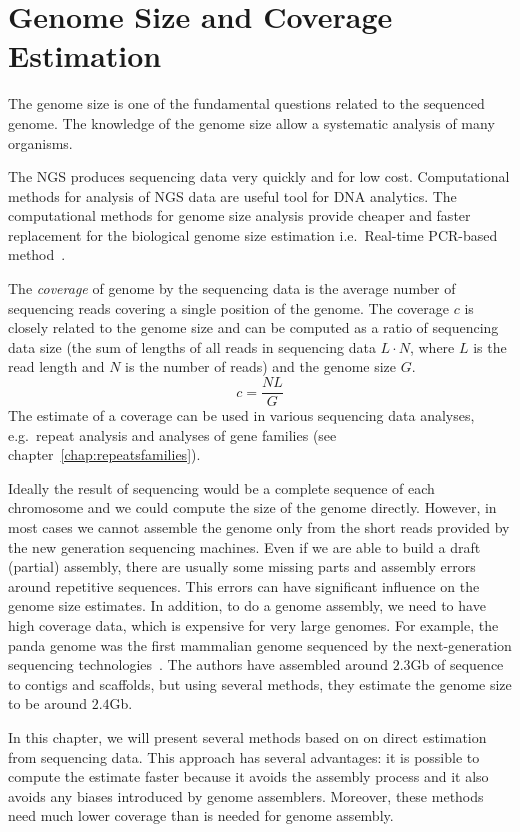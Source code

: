 \chapter[Genome Size and Coverage]{Genome Size and Coverage Estimation}
\label{chap:genomesize}

The genome size is one of the fundamental questions related to the sequenced genome. The knowledge of the genome size allow a systematic analysis of many organisms.

The NGS produces sequencing data very quickly and for low cost. Computational methods for analysis of NGS data are useful tool for DNA analytics. The computational methods for genome size analysis provide cheaper and faster replacement for the biological genome size estimation i.e.\ Real-time PCR-based method~\cite{wilhelm2003real}.

The \emph{coverage} of genome by the sequencing data is the average number of sequencing reads covering a single position of the genome. The coverage $c$ is closely related to the genome size and can be computed as a ratio of sequencing data size (the sum of lengths of all reads in sequencing data $L\cdot N$, where $L$ is the read length and $N$ is the number of reads) and the genome size $G$.
$$c = \frac{NL}{G}$$
The estimate of a coverage can be used in various sequencing data analyses, e.g.\ repeat analysis and analyses of gene families (see chapter~\ref{chap:repeatsfamilies}). 

Ideally the result of sequencing would be a complete sequence of each chromosome and we could compute the size of the genome directly.
However, in most cases we cannot assemble the genome only from the short reads provided by the new generation sequencing machines.
Even if we are able to build a draft (partial) assembly, there are usually some missing parts and assembly errors around repetitive sequences. This errors can have significant influence on the genome size estimates. In addition, to do a genome assembly, we need to have high coverage data, which is expensive for very large genomes. For example, the panda genome was the first mammalian genome sequenced
by the next-generation sequencing technologies~\cite{li2010panda}. The authors have assembled around $2.3$Gb of sequence to contigs and scaffolds, but using
several methods, they estimate the genome size to be around $2.4$Gb.

In this chapter, we will present several methods based on on direct estimation from sequencing data. This approach has several advantages: it is possible to compute the estimate faster because it avoids the assembly process and it also avoids any biases introduced by genome assemblers. Moreover, these methods need much lower coverage than is needed for genome assembly.

